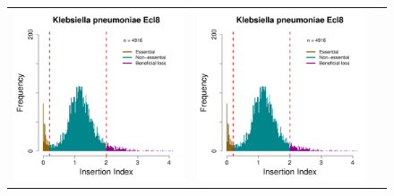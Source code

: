 \documentclass[a4paper,10pt, twocolumn]{article}
\begin{document}
\begin{figure}
\centering
\begin{tabular}{c c c}
\includegraphics[page=1, scale=0.28]{per-species-insertion-index.pdf} &
\includegraphics[page=2, scale=0.28]{per-species-insertion-index.pdf} &

\end{tabular}
\end{figure}
\end{document}
